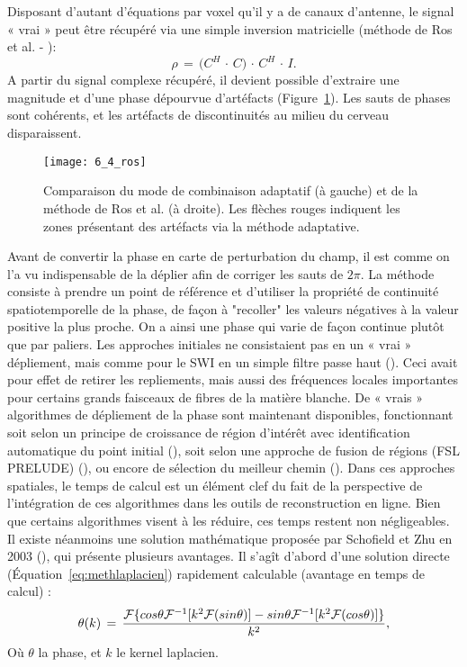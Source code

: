 {Disposant d’autant d’équations par voxel qu’il y a de canaux d’antenne, le signal « vrai » peut être
récupéré via une simple inversion matricielle (méthode de Ros et al. - \cite{Ros2009}):
\begin{equation}
\rho\,=\,\bigl(C^H\,\cdot\, C\bigr)\,\cdot\,C^H\,\cdot\,I.
\end{equation}
A partir du signal complexe récupéré, il devient possible d’extraire une magnitude et d’une phase
dépourvue d’artéfacts (Figure~\ref{fig:6_4_ros}). Les sauts de phases sont cohérents, et les artéfacts de discontinuités
au milieu du cerveau disparaissent.

\begin{figure}[!t]
\centering
\texttt{[image: 6\_4\_ros]}
\caption{Comparaison du mode de combinaison adaptatif (à
gauche) et de la méthode de Ros et al. (à droite). Les flèches
rouges indiquent les zones présentant des artéfacts via la
méthode adaptative.}
\label{fig:6_4_ros}	
\end{figure}
Avant de convertir la phase en carte de perturbation du champ, il est comme on l’a vu
indispensable de la déplier afin de corriger les sauts de $2\pi$. La méthode consiste à prendre un point
de référence et d’utiliser la propriété de continuité spatiotemporelle de la phase, de façon à "recoller"
les valeurs négatives à la valeur positive la plus proche. On a ainsi une phase qui varie de façon continue
plutôt que par paliers. Les approches initiales ne consistaient pas en un « vrai » dépliement, mais comme
pour le SWI en un simple filtre passe haut (\cite{Reichenbach2001}). Ceci avait pour effet de retirer les repliements, mais
aussi des fréquences locales importantes pour certains grands faisceaux de fibres de la matière
blanche. De « vrais » algorithmes de dépliement de la phase sont maintenant disponibles, fonctionnant
soit selon un principe de croissance de région d’intérêt avec identification automatique du point initial
(\cite{Witoszynskyj2009}), soit selon une approche de fusion de régions (FSL PRELUDE) (\cite{Jenkinson2003}), ou encore de sélection du
meilleur chemin (\cite{Abdul-Rahman2007}). Dans ces approches spatiales, le temps de calcul est un élément clef du fait de
la perspective de l’intégration de ces algorithmes dans les outils de reconstruction en ligne. Bien que
certains algorithmes visent à les réduire, ces temps restent non négligeables.
Il existe néanmoins une solution mathématique proposée par Schofield et Zhu en 2003 (\cite{Schofield2003}), qui
présente plusieurs avantages. Il s’agît d’abord d’une solution directe (Équation~\ref{eq:methlaplacien}) rapidement
calculable (avantage en temps de calcul) :
\begin{equation}
\label{eq:methlaplacien}
\theta(k)\,=\,\frac{{\cal F}\{cos\theta {\cal F}^{-1} [k^2{\cal F}(sin\theta)]-sin\theta{\cal F}^{-1}[k^2{\cal F}(cos\theta)]\}}{k^2},
\end{equation}
Où $\theta$ la phase, et $k$ le kernel laplacien.

}
